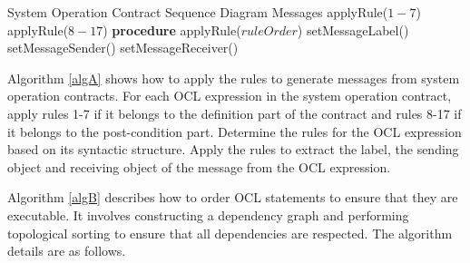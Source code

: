 \documentclass[pdflatex,sn-mathphys-num]{sn-jnl}%
\renewcommand{\algorithmicrequire}{\textbf{Input:}}
\theoremstyle{thmstyleone}%
\theoremstyle{thmstyletwo}%
\theoremstyle{thmstylethree}%
\begin{document}
\begin{algorithm}
\caption{Sequence Diagram Messages Generation}
\label{algA}
    \begin{algorithmic}[1]
        \REQUIRE System Operation Contract
        \ENSURE Sequence Diagram Messages
                \STATE applyRule($1-7$)
                \STATE applyRule($8-17$)
            \ENDIF
        \ENDFOR
        \STATE \textbf{procedure} applyRule($ruleOrder$)
        \STATE \quad setMessageLabel()
        \STATE \quad setMessageSender()
        \STATE \quad setMessageReceiver()
    \end{algorithmic}
\end{algorithm}


Algorithm \ref{algA} shows how to apply the rules to generate messages from system operation contracts. For each OCL expression in the system operation contract, apply rules 1-7 if it belongs to the definition part of the contract and rules 8-17 if it belongs to the post-condition part. Determine the rules for the OCL expression based on its syntactic structure. Apply the rules to extract the label, the sending object and receiving object of the message from the OCL expression.

Algorithm \ref{algB} describes how to order OCL statements to ensure that they are executable. It involves constructing a dependency graph and performing topological sorting to ensure that all dependencies are respected. The algorithm details are as follows.
\end{document}
